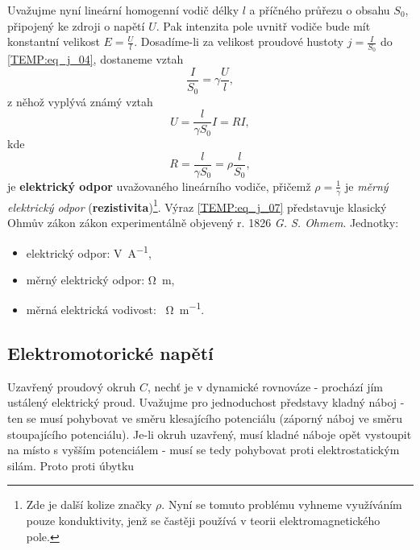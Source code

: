       Uvažujme nyní lineární homogenní vodič délky $l$ a příčného průřezu o obsahu $S_0$, připojený
      ke zdroji o napětí $U$. Pak intenzita pole uvnitř vodiče bude mít konstantní velikost
      $E=\frac{U}{l}$. Dosadíme-li za velikost proudové hustoty $j=\frac{I}{S_0}$ do
      \ref{TEMP:eq_j_04}, dostaneme vztah
      \begin{equation}\label{TEMP:eq_j_05}
        \frac{I}{S_0} = \gamma\frac{U}{l},
      \end{equation}        
      z něhož vyplývá známý vztah
      \begin{equation}\label{TEMP:eq_j_06}
        U = \frac{l}{\gamma S_0}I = RI,
      \end{equation}              
      kde
      \begin{equation}\label{TEMP:eq_j_07}
        R = \frac{l}{\gamma S_0} = \rho\frac{l}{S_0},
      \end{equation} 
      je \textbf{elektrický odpor} uvažovaného lineárního vodiče, přičemž $\rho = \frac{1}{\gamma}$
      je \emph{měrný elektrický odpor} (\textbf{rezistivita})\footnote{Zde je další kolize značky
      $\rho$. Nyní se tomuto problému vyhneme využíváním pouze konduktivity, jenž se častěji
      používá v teorii elektromagnetického pole.}. Výraz \ref{TEMP:eq_j_07} představuje klasický
      Ohmův zákon zákon experimentálně objevený r. 1826 \emph{G. S. Ohmem}. Jednotky:
      \begin{itemize}[noitemsep]
        \item elektrický odpor: \unit{\V\per\A},
        \item měrný elektrický odpor: \unit{\ohm\m},
        \item měrná elektrická vodivost: \unit{\per\ohm\per\m}.
      \end{itemize}

        

    \subsection{Elektromotorické napětí}
      Uzavřený proudový okruh $C$, nechť je v dynamické rovnováze - prochází jím ustálený
      elektrický proud. Uvažujme pro jednoduchost představy kladný náboj - ten se musí pohybovat ve
      směru klesajícího potenciálu (záporný náboj ve směru stoupajícího potenciálu). Je-li okruh
      uzavřený, musí kladné náboje opět vystoupit na místo s vyšším potenciálem - musí se tedy
      pohybovat proti elektrostatickým silám. Proto proti úbytku      
               
